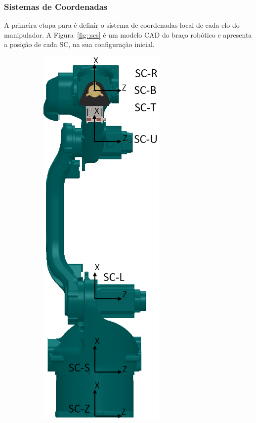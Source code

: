 \subsubsection{Sistemas de Coordenadas}

A primeira etapa para é definir o sistema de coordenadas local de cada elo do
manipulador. A Figura~\ref{fig::scs} é um modelo CAD do braço robótico e
apresenta a posição de cada SC, na sua configuração inicial.

\begin{figure}[h]
    \centering
    \begin{subfigure}[b]{0.20\textwidth}
        \includegraphics[width=\textwidth]{figs/sc_front}

\end{subfigure}
\end{figure}
